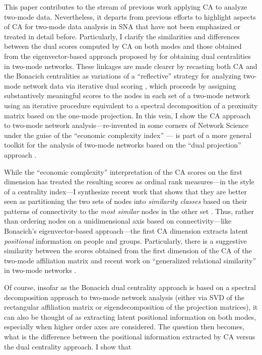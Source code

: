 This paper contributes to the stream of previous work applying CA to analyze two-mode data. Nevertheless, it departs from previous efforts to highlight aspects of CA for two-mode data analysis in SNA that have not been emphasized or treated in detail before. Particularly, I clarify the similarities and differences between the dual scores computed by CA on both modes and those obtained from the eigenvector-based approach proposed by \citet{bonacich1991simultaneous} for obtaining dual centralities in two-mode networks. These linkages are made clearer by recasting both CA and the Bonacich centralities as variations of a ``reflective'' strategy for analyzing two-mode network data via iterative dual scoring \citep{yang2022comparing, yang2020birank}, which proceeds by assigning substantively meaningful scores to the nodes in each set of a two-mode network using an iterative procedure equivalent to a spectral decomposition of a proximity matrix based on the one-mode projection. In this vein, I show the CA approach to two-mode network analysis---re-invented in some corners of Network Science under the guise of the ``economic complexity index'' \citep{hidalgo2009building, mealy2019interpreting, van2021correspondence}--- is part of a more general toolkit for the analysis of two-mode networks based on the ``dual projection'' approach \citep{everett2013dual}.

While the ``economic complexity'' interpretation of the CA scores on the first dimension has treated the resulting scores as ordinal rank measures---in the style of a centrality index---I synthesize recent work that shows that they are better seen as partitioning the two sets of nodes into \textit{similarity classes} based on their patterns of connectivity to the \textit{most similar} nodes in the other set \citep{kovacs2010generalized, lizardo2024two}. Thus, rather than ordering nodes on a unidimensional axis based on connectivity---like Bonacich's \citeyearpar{bonacich1991simultaneous} eigenvector-based approach---the first CA dimension extracts latent \textit{positional} information on people and groups. Particularly, there is a suggestive similarity between the scores obtained from the first dimension of the CA of the two-mode affiliation matrix and recent work on ``generalized relational similarity'' in two-mode networks \citep{kovacs2010generalized, lizardo2024two}. 

Of course, insofar as the Bonacich dual centrality approach is based on a spectral decomposition approach to two-mode network analysis (either via SVD of the rectangular affiliation matrix or eigendecomposition of the projection matrices), it can also be thought of as extracting latent positional information on both modes, especially when higher order axes are considered. The question then becomes, what is the difference between the positional information extracted by CA versus the dual centrality approach. I show that 

